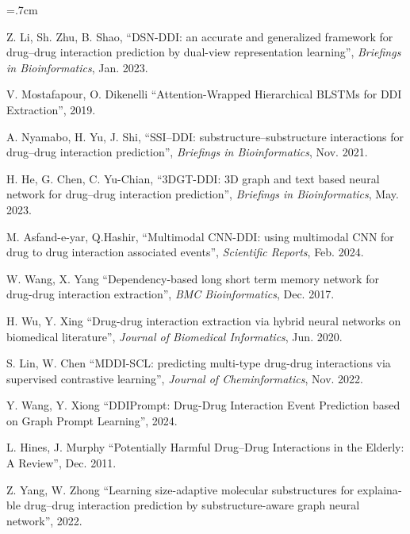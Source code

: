 \renewcommand{\bibname}{مراجع}

\begin{thebibliography}{99}

\begin{latin}

\baselineskip=.7cm

Z. Li, Sh. Zhu, B. Shao, “DSN-DDI: an accurate and generalized framework for drug–drug interaction prediction by dual-view representation learning”, \textit{Briefings in Bioinformatics}, Jan. 2023.

V. Mostafapour, O. Dikenelli “Attention-Wrapped Hierarchical BLSTMs for DDI Extraction”, 2019.

A. Nyamabo, H. Yu, J. Shi, “SSI–DDI: substructure–substructure interactions for drug–drug interaction prediction”, \textit{Briefings in Bioinformatics}, Nov. 2021.

H. He, G. Chen, C. Yu-Chian, “3DGT-DDI: 3D graph and text based neural network for drug–drug interaction prediction”, \textit{Briefings in Bioinformatics},  May. 2023.

M. Asfand-e-yar, Q.Hashir, “Multimodal CNN-DDI: using multimodal CNN for drug to drug interaction associated events”, \textit{Scientific Reports}, Feb. 2024.

W. Wang, X. Yang “Dependency-based long short term memory network for drug-drug interaction extraction”, \textit{BMC Bioinformatics}, Dec. 2017.

H. Wu, Y. Xing “Drug-drug interaction extraction via hybrid neural networks on biomedical literature”, \textit{Journal of Biomedical Informatics}, Jun. 2020.

S. Lin, W. Chen “MDDI-SCL: predicting multi-type drug-drug interactions via supervised contrastive learning”, \textit{Journal of Cheminformatics}, Nov. 2022.

Y. Wang, Y. Xiong “DDIPrompt: Drug-Drug Interaction Event Prediction based on Graph Prompt Learning”, 2024.

L. Hines, J. Murphy “Potentially Harmful Drug–Drug Interactions in the Elderly: A Review”, Dec. 2011.

Z. Yang, W. Zhong “Learning size-adaptive molecular substructures for explainable drug–drug interaction prediction by substructure-aware graph neural network”, 2022.


\end{latin}
\end{thebibliography}
